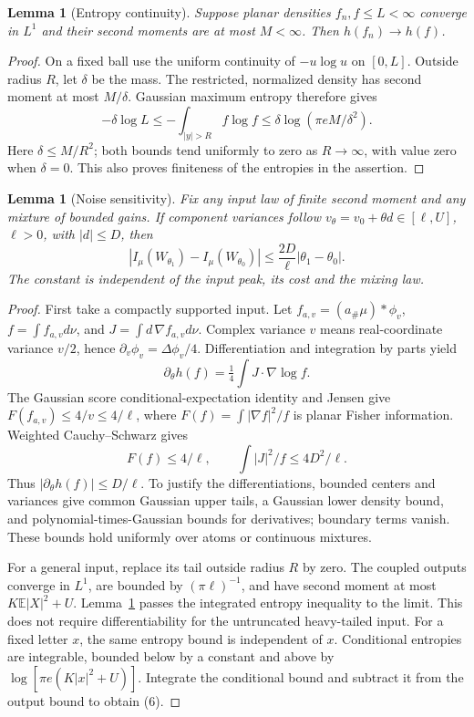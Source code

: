 \documentclass[11pt]{article}
\newtheorem{lemma}[theorem]{Lemma}
\newcommand{\E}{\mathbb E}
\begin{document}
\begin{lemma}[Entropy continuity]\label{lem:entropy}
Suppose planar densities \(f_n,f\leq L<\infty\) converge in \(L^1\)
and their second moments are at most \(M<\infty\). Then
\(h(f_n)\to h(f)\).
\end{lemma}
\begin{proof}
On a fixed ball use the uniform continuity of \(-u\log u\) on \([0,L]\).
Outside radius \(R\), let \(\delta\) be the mass. The restricted,
normalized density has second moment at most \(M/\delta\). Gaussian
maximum entropy therefore gives
\[
 -\delta\log L\leq-\int_{|y|>R} f\log f
 \leq\delta\log(\pi eM/\delta^2).
\]
Here \(\delta\leq M/R^2\); both bounds tend uniformly to zero as
\(R\to\infty\), with value zero when \(\delta=0\).
This also proves finiteness of the entropies in the assertion.
\end{proof}

\begin{lemma}[Noise sensitivity]\label{lem:noise}
Fix any input law of finite second moment and any mixture of bounded
gains. If component variances follow
\(v_\theta=v_0+\theta d\in[\ell,U]\), \(\ell>0\), with
\(|d|\leq D\), then
\[
 |I_\mu(W_{\theta_1})-I_\mu(W_{\theta_0})|
       \leq \frac{2D}{\ell}|\theta_1-\theta_0|.              \tag{6}
\]
The constant is independent of the input peak, its cost and the mixing law.
\end{lemma}
\begin{proof}
First take a compactly supported input. Let
\(f_{a,v}=(a_\#\mu)*\phi_v\), \(f=\int f_{a,v}d\nu\), and
\(J=\int d\,\nabla f_{a,v}d\nu\). Complex variance \(v\) means
real-coordinate variance \(v/2\), hence
\(\partial_v\phi_v=\Delta\phi_v/4\).
Differentiation and integration by parts yield
\[
 \partial_\theta h(f)=\tfrac14\int J\cdot\nabla\log f .
\]
The Gaussian score conditional-expectation identity and Jensen give
\(F(f_{a,v})\leq4/v\leq4/\ell\), where
\(F(f)=\int |\nabla f|^2/f\) is planar Fisher information.
Weighted Cauchy--Schwarz gives
\[
 F(f)\leq4/\ell,\qquad \int |J|^2/f\leq4D^2/\ell .
\]
Thus \(|\partial_\theta h(f)|\leq D/\ell\).
To justify the differentiations, bounded centers and variances give
common Gaussian upper tails, a Gaussian lower density bound, and
polynomial-times-Gaussian bounds for derivatives; boundary terms vanish.
These bounds hold uniformly over atoms or continuous mixtures.

For a general input, replace its tail outside radius \(R\) by zero.
The coupled outputs converge in \(L^1\), are bounded by
\((\pi\ell)^{-1}\), and have second moment at most
\(K\E|X|^2+U\). Lemma~\ref{lem:entropy} passes the integrated entropy
inequality to the limit. This does not require differentiability for the
untruncated heavy-tailed input.
For a fixed letter \(x\), the same entropy bound is independent of \(x\).
Conditional entropies are integrable, bounded below by a constant and
above by \(\log[\pi e(K|x|^2+U)]\). Integrate the conditional bound and
subtract it from the output bound to obtain (6).
\end{proof}
\end{document}
